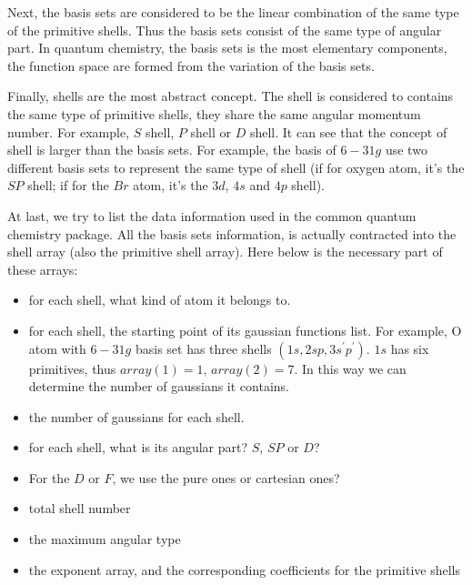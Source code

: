 Next, the basis sets are considered to be the linear combination of
the same type of the primitive shells. Thus the basis sets consist of
the same type of angular part. In quantum chemistry, the basis sets is
the most elementary components, the function space are formed from the
variation of the basis sets.

Finally, shells are the most abstract concept. The shell is considered
to contains the same type of primitive shells, they share the same
angular momentum number. For example, $S$ shell, $P$ shell or $D$
shell. It can see that the concept of shell is larger than the basis
sets. For example, the basis of $6-31g$ use two different basis sets
to represent the same type of shell (if for oxygen atom, it's the $SP$
shell; if for the $Br$ atom, it's the $3d$, $4s$ and $4p$ shell).

At last, we try to list the data information used in the common
quantum chemistry package. All the basis sets information, is actually
contracted into the shell array (also the primitive shell array). Here
below is the necessary part of these arrays:
\begin{itemize}
\item for each shell, what kind of atom it belongs to.
\item for each shell, the starting point of its gaussian functions
  list. For example, O atom with $6-31g$ basis set has three shells
  $(1s, 2sp, 3s^{'}p^{'})$. $1s$ has six primitives, thus $array(1) =
  1$, $array(2) = 7$. In this way we can determine the number of
  gaussians it contains.
\item the number of gaussians for each shell.
\item for each shell, what is its angular part? $S$, $SP$ or $D$?
\item For the $D$ or $F$, we use the pure ones or cartesian ones?
\item total shell number
\item the maximum angular type
\item the exponent array, and the corresponding coefficients for the
  primitive shells
\end{itemize}

